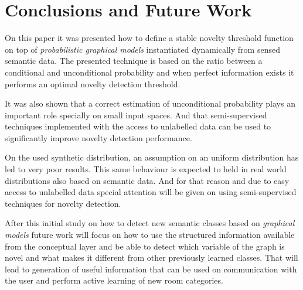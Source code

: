 \documentclass[runningheads,a4paper]{llncs}
\begin{document}
\section{Conclusions and Future Work}
On this paper it was presented how to define a stable novelty threshold function on
top of \emph{probabilistic graphical models} instantiated dynamically from sensed
semantic data.
The presented technique is based on the ratio between a conditional and
unconditional probability and when perfect information exists it performs an optimal
novelty detection threshold.

It was also shown that a correct estimation of unconditional probability plays an
important role specially on small input spaces. And that semi-supervised techniques
implemented with the access to unlabelled data can be used to significantly improve
novelty detection performance.

On the used synthetic distribution, an assumption on an uniform
distribution has led to very poor results. This same behaviour is expected to held
in real world distributions also based on semantic data. And for that reason
and due to easy access to unlabelled data special attention will be given on using
semi-supervised techniques for novelty detection.

After this initial study on how to detect new semantic classes based on
\emph{graphical models} future work will focus on how to use the structured
information available from the conceptual layer and be able to detect which variable
of the graph is novel and what makes it different from other previously learned
classes. That will lead to generation of useful information that can be used on
communication with the user and perform active learning of new room categories.




\end{document}
